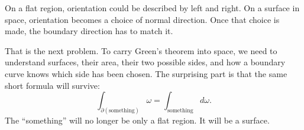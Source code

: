 On a flat region, orientation could be described by left and right.  On a surface in
space, orientation becomes a choice of normal direction.  Once that choice is made, the
boundary direction has to match it.

That is the next problem.  To carry Green's theorem into space, we need to understand
surfaces, their area, their two possible sides, and how a boundary curve knows which
side has been chosen.  The surprising part is that the same short formula will survive:
\[
    \int_{\partial(\text{something})}\omega
    =
    \int_{\text{something}}d\omega.
\]
The ``something'' will no longer be only a flat region.  It will be a surface.
